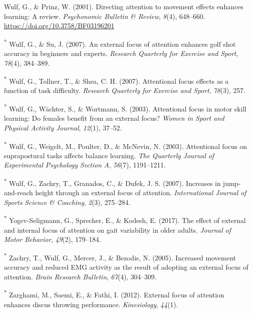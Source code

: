 \documentclass[
  man, donotrepeattitle,floatsintext]{apa7}
\newlength{\cslhangindent}
\newlength{\cslentryspacingunit} %
\newenvironment{CSLReferences}[2] %
 {%
  \setlength{\parindent}{0pt}
  \ifodd #1
  \let\oldpar\par
  \def\par{\hangindent=\cslhangindent\oldpar}
  \fi
  \setlength{\parskip}{#2\cslentryspacingunit}
 }%
 {}
\begin{document}
\begin{CSLReferences}{1}{0}
\leavevmode{}%
Wulf, G., \& Prinz, W. (2001). Directing attention to movement effects enhances learning: {A} review. \emph{Psychonomic Bulletin \& Review}, \emph{8}(4), 648--660. \url{https://doi.org/10.3758/BF03196201}

\leavevmode{}%
\textsuperscript{*} Wulf, G., \& Su, J. (2007). An external focus of attention enhances golf shot accuracy in beginners and experts. \emph{Research Quarterly for Exercise and Sport}, \emph{78}(4), 384--389.

\leavevmode{}%
\textsuperscript{*} Wulf, G., Tollner, T., \& Shea, C. H. (2007). Attentional focus effects as a function of task difficulty. \emph{Research Quarterly for Exercise and Sport}, \emph{78}(3), 257.

\leavevmode{}%
\textsuperscript{*} Wulf, G., Wächter, S., \& Wortmann, S. (2003). Attentional focus in motor skill learning: Do females benefit from an external focus? \emph{Women in Sport and Physical Activity Journal}, \emph{12}(1), 37--52.

\leavevmode{}%
\textsuperscript{*} Wulf, G., Weigelt, M., Poulter, D., \& McNevin, N. (2003). Attentional focus on suprapostural tasks affects balance learning. \emph{The Quarterly Journal of Experimental Psychology Section A}, \emph{56}(7), 1191--1211.

\leavevmode{}%
\textsuperscript{*} Wulf, G., Zachry, T., Granados, C., \& Dufek, J. S. (2007). Increases in jump-and-reach height through an external focus of attention. \emph{International Journal of Sports Science \& Coaching}, \emph{2}(3), 275--284.

\leavevmode{}%
\textsuperscript{*} Yogev-Seligmann, G., Sprecher, E., \& Kodesh, E. (2017). The effect of external and internal focus of attention on gait variability in older adults. \emph{Journal of Motor Behavior}, \emph{49}(2), 179--184.

\leavevmode{}%
\textsuperscript{*} Zachry, T., Wulf, G., Mercer, J., \& Bezodis, N. (2005). Increased movement accuracy and reduced EMG activity as the result of adopting an external focus of attention. \emph{Brain Research Bulletin}, \emph{67}(4), 304--309.

\leavevmode{}%
\textsuperscript{*} Zarghami, M., Saemi, E., \& Fathi, I. (2012). External focus of attention enhances discus throwing performance. \emph{Kinesiology}, \emph{44}(1).


\end{CSLReferences}
\end{document}
